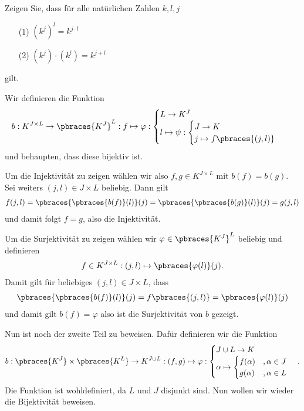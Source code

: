 \begin{exercise}
    Zeigen Sie, dass für alle natürlichen Zahlen $k,l,j$ 
    \begin{itemize}
        \item[(1)] $(k^j)^l = k^{j \cdot l}$ 
        \item[(2)] $(k^j) \cdot (k^l) = k^{j + l}$
    \end{itemize}
    gilt.
\end{exercise}

\begin{solution}
    Wir definieren die Funktion 
    \begin{align*}
        b: K^{J \times L} \to \pbraces{K^J}^L : f \mapsto \varphi: 
        \begin{cases}
            L \to K^J \\
            l \mapsto \psi: 
            \begin{cases}
                J \to K \\
                j \mapsto f\pbraces{(j,l)}
            \end{cases}
        \end{cases}  
    \end{align*}
    und behaupten, dass diese bijektiv ist.

    Um die Injektivität zu zeigen wählen wir also $f,g \in K^{J \times L}$ mit $b(f) = b(g)$. Sei weiters $(j,l) \in J \times L$ beliebig. Dann gilt 
    \begin{align*}
        f(j,l) = \pbraces{ \pbraces{b(f) }(l) }(j) = \pbraces{ \pbraces{b(g) }(l) }(j) = g(j,l)
    \end{align*}
    und damit folgt $f = g$, also die Injektivität.

    Um die Surjektivität zu zeigen wählen wir $\varphi \in \pbraces{K^J}^L$ beliebig und definieren 
    \begin{align*}
        f \in K^{J \times L}: (j, l) \mapsto \pbraces{\varphi(l)}(j).
    \end{align*}
    Damit gilt für beliebiges $(j,l) \in J \times L$, dass
    \begin{align*}
        \pbraces{\pbraces{b(f) }(l) }(j) = f\pbraces{(j,l)} = \pbraces{\varphi(l)}(j)
    \end{align*}
    und damit gilt $b(f) = \varphi$ also ist die Surjektivität von $b$ gezeigt.
    
    Nun ist noch der zweite Teil zu beweisen. Dafür definieren wir die Funktion
    \begin{align*}
        b: \pbraces{K^J} \times \pbraces{K^L} \to K^{J \cup L}: (f,g) \mapsto \varphi:
        \begin{cases}
            J \cup L \to K \\
            \alpha \mapsto 
            \begin{cases}
                f(\alpha) &, \alpha \in J \\
                g(\alpha) &, \alpha \in L
            \end{cases}
        \end{cases} .
    \end{align*}
    Die Funktion ist wohldefiniert, da $L$ und $J$ disjunkt sind. Nun wollen wir wieder die Bijektivität beweisen.


\end{solution}

